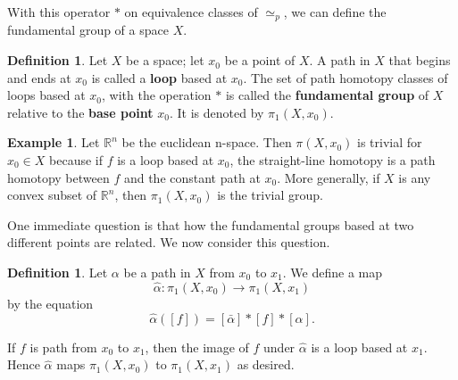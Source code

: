 \documentclass[psamsfonts]{amsart}
\theoremstyle{definition}
\newtheorem{defn}[thm]{Definition}
\newtheorem{exmp}[thm]{Example}
\theoremstyle{remark}
\numberwithin{equation}{section}
\begin{document}
	With this operator $*$ on equivalence classes of $\simeq_p$, we can define the fundamental group of a space $X$.
	
	\begin{defn}
		Let $X$ be a space; let $x_0$ be a point of $X$. A path in $X$ that begins and ends at $x_0$ is called a \textbf{loop} based at $x_0$. The set of path homotopy classes of loops based at $x_0$, with the operation $*$ is called the \textbf{fundamental group} of $X$ relative to the \textbf{base point} $x_0$. It is denoted by $\pi_1(X,x_0)$.	
	\end{defn}
	
	\begin{exmp}
		Let $\mathbb{R}^n$ be the euclidean n-space. Then $\pi(X,x_0)$ is trivial for $x_0 \in X$ because if $f$ is a loop based at $x_0$, the straight-line homotopy is a path homotopy between $f$ and the constant path at $x_0$. More generally, if $X$ is any convex subset of $\mathbb{R}^n$, then $\pi_1(X,x_0)$ is the trivial group.
	\end{exmp}	
	
	One immediate question is that how the fundamental groups based at two different points are related. We now consider this question.
	
	\begin{defn}
		Let $\alpha$ be a path in $X$ from $x_0$ to $x_1$. We define a map 
		\begin{equation}
			\hat{\alpha}: \pi_1(X,x_0) \to \pi_1(X,x_1)
		\end{equation}
		by the equation
		\begin{equation}
			\hat{\alpha}([f]) = [\bar{\alpha}]*[f]*[\alpha].
		\end{equation}
	\end{defn}
	
	If $f$ is path from $x_0$ to $x_1$, then the image of $f$ under $\hat{\alpha}$ is a loop based at $x_1$. Hence $\hat{\alpha}$ maps $\pi_1(X,x_0)$ to $\pi_1(X,x_1)$ as desired.
	
\end{document}
